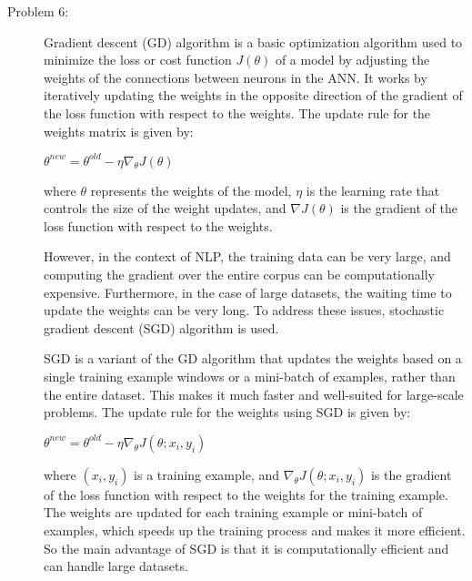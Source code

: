 \documentclass[12pt]{article}
\begin{document}
\begin{description}
  \pagebreak

  \item[Problem 6:] \hfill %
  
  Gradient descent (GD) algorithm is a basic optimization algorithm used to minimize the loss or cost function $J(\theta)$ of a model by adjusting the weights of the connections between neurons in the ANN.
  It works by iteratively updating the weights in the opposite direction of the gradient of the loss function with respect to the weights. The update rule for the weights matrix is given by:

  \begin{center}
    $\displaystyle{\theta^{new} = \theta^{old} - \eta \nabla_{\theta} J(\theta)}$
  \end{center}
  
  where $\theta$ represents the weights of the model, $\eta$ is the learning rate that controls the size of the weight updates, and $\nabla J(\theta)$ is the gradient of the 
  loss function with respect to the weights.

  However, in the context of NLP, the training data can be very large, and computing the gradient over the entire corpus can be computationally expensive. Furthermore, 
  in the case of large datasets, the waiting time to update the weights can be very long. To address these issues, stochastic gradient descent (SGD) algorithm is used.

  SGD is a variant of the GD algorithm that updates the weights based on a single training example windows or a mini-batch of examples, rather than the entire dataset. This makes it 
  much faster and well-suited for large-scale problems. The update rule for the weights using SGD is given by:

  \begin{center}
    $\displaystyle{\theta^{new} = \theta^{old} - \eta \nabla_{\theta} J(\theta; x_i, y_i)}$
  \end{center}

  where $(x_i, y_i)$ is a training example, and $\nabla_{\theta} J(\theta; x_i, y_i)$ is the gradient of the loss function with respect to the weights for the training example.
  The weights are updated for each training example or mini-batch of examples, which speeds up the training process and makes it more efficient. So the main advantage of SGD 
  is that it is computationally efficient and can handle large datasets.


\end{description}
\end{document}
